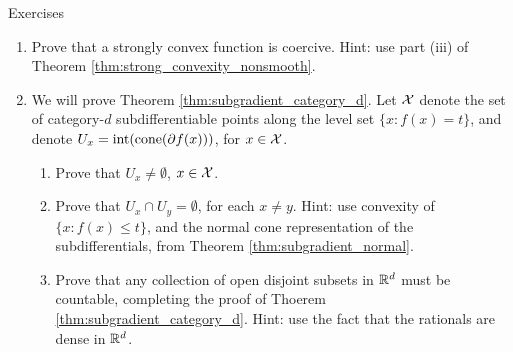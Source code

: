 \begin{xcb}{Exercises}
\begin{enumerate}[label=\thechapter.\arabic*]
\item \label{ex:strong_convexity_coercive}
  Prove that a strongly convex function is coercive. Hint: use part (iii) of
  Theorem \ref{thm:strong_convexity_nonsmooth}.  




\item \label{ex:subgradient_category_d}
  We will prove Theorem \ref{thm:subgradient_category_d}. Let $\mathcal{X}$ denote the
  set of category-$d$ subdifferentiable points along the level set $\{x : f(x) =
  t\}$, and denote $U_x = \operatorname{int}(\operatorname{cone}(\partial f(x)))$, for $x \in \mathcal{X}$. 

\begin{enumerate}[label=\alph*.]
\item Prove that $U_x \not= \emptyset$, $x \in \mathcal{X}$.

\item Prove that $U_x \cap U_y = \emptyset$, for each $x \not= y$. Hint: use
  convexity of $\{x : f(x) \leq t\}$, and the normal cone representation of the 
  subdifferentials, from Theorem \ref{thm:subgradient_normal}.    

\item Prove that any collection of open disjoint subsets in $\mathbb{R}^d$ must be 
  countable, completing the proof of Thoerem
  \ref{thm:subgradient_category_d}. Hint: use the fact that the rationals are
  dense in $\mathbb{R}^d$.
\end{enumerate}

\end{enumerate}
\end{xcb}